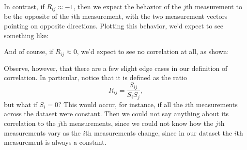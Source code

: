 \documentclass[letterpaper]{article}
\theoremstyle{remark}
\renewcommand{\tilde}[1]{\widetilde{#1}}
\begin{document}
In contrast, if $R_{ij} \approx -1$, then we expect the behavior of the $j$th measurement to be the opposite of the $i$th measurement, with the two measurement vectors pointing on opposite directions. Plotting this behavior, we'd expect to see something like:
\begin{center}
\end{center}

And of course, if $R_{ij} \approx 0$, we'd expect to see no correlation at all, as shown:
\begin{center}
\end{center}

Observe, however, that there are a few slight edge cases in our definition of correlation. In particular, notice that it is defined as the ratio
\[
    R_{ij} = \frac{S_{ij}}{S_iS_j},
\]
but what if $S_i = 0$? This would occur, for instance, if all the $i$th measurements across the dataset were constant. Then we could not say anything about its correlation to the $j$th measurements, since we could not know how the $j$th measurements vary as the $i$th measurements change, since in our dataset the $i$th measurement is always a constant.
\end{document}
